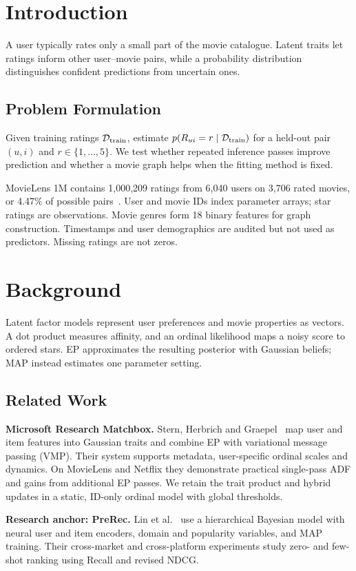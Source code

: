 \documentclass[11pt,a4paper]{article}
\begin{document}
\section{Introduction}
A user typically rates only a small part of the movie catalogue. Latent
traits let ratings inform other user--movie pairs, while a probability
distribution distinguishes confident predictions from uncertain ones.

\subsection{Problem Formulation}
Given training ratings $\mathcal D_{\rm train}$, estimate
$p(R_{ui}=r\mid\mathcal D_{\rm train})$ for a held-out pair $(u,i)$ and
$r\in\{1,\ldots,5\}$. We test whether repeated inference passes improve
prediction and whether a movie graph helps when the fitting method is fixed.

MovieLens 1M contains 1,000,209 ratings from 6,040 users on 3,706 rated movies,
or 4.47\% of possible pairs~\cite{movielens,harper2015}. User and movie IDs
index parameter arrays; star ratings are observations. Movie genres form
18 binary features for graph construction. Timestamps and user demographics
are audited but not used as predictors. Missing ratings are not zeros.

\section{Background}
Latent factor models represent user preferences and movie properties as
vectors. A dot product measures affinity, and an ordinal likelihood maps
a noisy score to ordered stars. EP approximates the resulting posterior
with Gaussian beliefs; MAP instead estimates one parameter setting.

\subsection{Related Work}
\textbf{Microsoft Research Matchbox.}
Stern, Herbrich and Graepel~\cite{stern2009} map user and item features into
Gaussian traits and combine EP with variational message passing (VMP).
Their system supports metadata, user-specific ordinal scales and dynamics.
On MovieLens and Netflix they demonstrate practical single-pass ADF and
gains from additional EP passes. We retain the trait product and hybrid
updates in a static, ID-only ordinal model with global thresholds.

\textbf{Research anchor: PreRec.} Lin et al.~\cite{lin2024} use a hierarchical
Bayesian model with neural user and item encoders, domain and popularity
variables, and MAP training. Their cross-market and cross-platform
experiments study zero- and few-shot ranking using Recall and revised NDCG.
\end{document}
